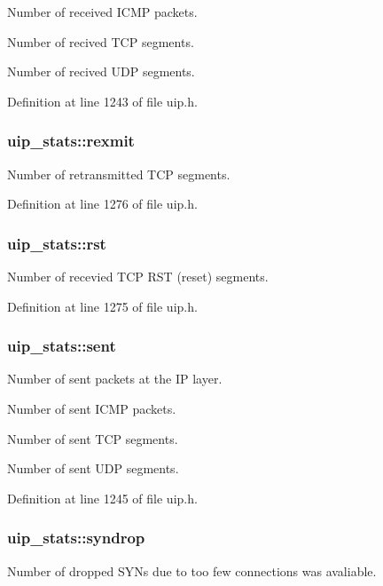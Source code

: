 Number of received ICMP packets.

Number of recived TCP segments.

Number of recived UDP segments. 

Definition at line 1243 of file uip.h.

\hypertarget{structuip__stats_a3ad48284f7a91f78bb24096aad89056e}{
\subsubsection[{rexmit}]{ {\bf uip\_\-stats::rexmit}}}
\label{structuip__stats_a3ad48284f7a91f78bb24096aad89056e}
Number of retransmitted TCP segments. 

Definition at line 1276 of file uip.h.

\hypertarget{structuip__stats_ab6e9a75167bdddd561373bc5b6ef501c}{
\subsubsection[{rst}]{ {\bf uip\_\-stats::rst}}}
\label{structuip__stats_ab6e9a75167bdddd561373bc5b6ef501c}
Number of recevied TCP RST (reset) segments. 

Definition at line 1275 of file uip.h.

\hypertarget{structuip__stats_adc69abadd5aa07c7d74f9292db2cd93c}{
\subsubsection[{sent}]{ {\bf uip\_\-stats::sent}}}
\label{structuip__stats_adc69abadd5aa07c7d74f9292db2cd93c}
Number of sent packets at the IP layer.

Number of sent ICMP packets.

Number of sent TCP segments.

Number of sent UDP segments. 

Definition at line 1245 of file uip.h.

\hypertarget{structuip__stats_a494ea6767a8a8fab7abe96b799d6c3b3}{
\subsubsection[{syndrop}]{ {\bf uip\_\-stats::syndrop}}}
\label{structuip__stats_a494ea6767a8a8fab7abe96b799d6c3b3}
Number of dropped SYNs due to too few connections was avaliable. 

